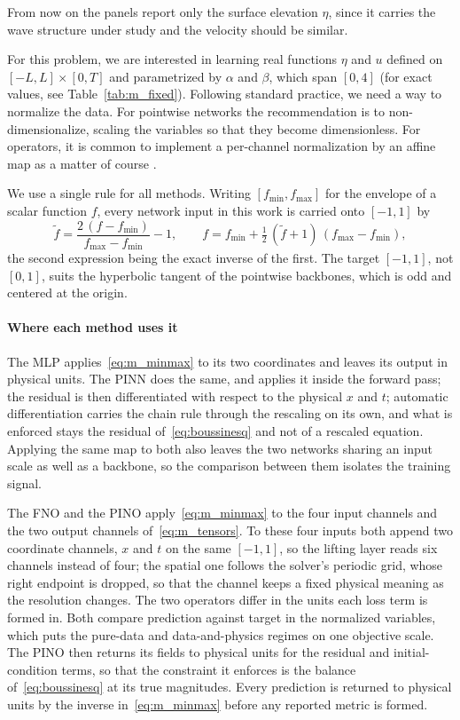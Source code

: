 From now on the panels report only the surface elevation $\eta$, since it carries the wave structure under study and the velocity should be similar.

For this problem, we are interested in learning real functions $\eta$ and $u$ defined on $[-L, L] \times [0, T]$ and parametrized by $\alpha$ and $\beta$, which span $[0, 4]$ (for exact values, see Table~\ref{tab:m_fixed}). Following standard practice, we need a way to normalize the data. For pointwise networks the recommendation is to non-dimensionalize, scaling the variables so that they become dimensionless. For operators, it is common to implement a per-channel normalization by an affine map as a matter of course \parencite{kossaifi2024,li2021}.

We use a single rule for all methods. Writing $[f_{\min}, f_{\max}]$ for the envelope of a scalar function $f$, every network input in this work is carried onto $[-1,1]$ by
\begin{equation}\label{eq:m_minmax}
    \tilde f = \frac{2\,(f - f_{\min})}{f_{\max} - f_{\min}} - 1,
    \qquad
    f = f_{\min} + \tfrac{1}{2}\,(\tilde f + 1)\,(f_{\max} - f_{\min}),
\end{equation}
the second expression being the exact inverse of the first. The target $[-1,1]$, not $[0,1]$, suits the hyperbolic tangent of the pointwise backbones, which is odd and centered at the origin.

\paragraph{Where each method uses it} The MLP applies~\eqref{eq:m_minmax} to its two coordinates and leaves its output in physical units. The PINN does the same, and applies it inside the forward pass; the residual is then differentiated with respect to the physical $x$ and $t$; automatic differentiation carries the chain rule through the rescaling on its own, and what is enforced stays the residual of~\eqref{eq:boussinesq} and not of a rescaled equation. Applying the same map to both also leaves the two networks sharing an input scale as well as a backbone, so the comparison between them isolates the training signal.

The FNO and the PINO apply~\eqref{eq:m_minmax} to the four input channels and the two output channels of~\eqref{eq:m_tensors}. To these four inputs both append two coordinate channels, $x$ and $t$ on the same $[-1,1]$, so the lifting layer reads six channels instead of four; the spatial one follows the solver's periodic grid, whose right endpoint is dropped, so that the channel keeps a fixed physical meaning as the resolution changes. The two operators differ in the units each loss term is formed in. Both compare prediction against target in the normalized variables, which puts the pure-data and data-and-physics regimes on one objective scale. The PINO then returns its fields to physical units for the residual and initial-condition terms, so that the constraint it enforces is the balance of~\eqref{eq:boussinesq} at its true magnitudes. Every prediction is returned to physical units by the inverse in~\eqref{eq:m_minmax} before any reported metric is formed.

